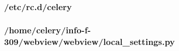 \documentclass[10pt,a4paper]{article}
\begin{document}
\begin{appendices}
  \subsubsection{/etc/rc.d/celery}
  \label{subs:etc-rcd-celery}
  

  \subsubsection{/home/celery/info-f-309/webview/webview/local\_settings.py}
  \label{subs:webview-local-settings}
  
\end{appendices}
\end{document}
